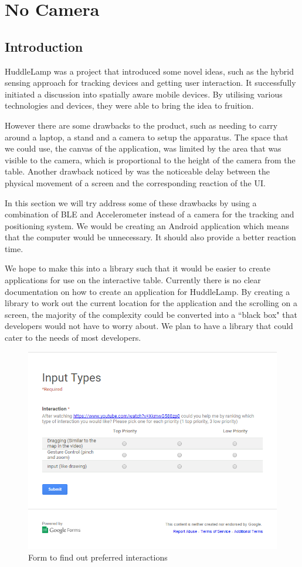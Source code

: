 \chapter{No Camera}

\label{ch:no_camera}

\section{Introduction}
HuddleLamp was a project that introduced some novel ideas, such as the hybrid sensing approach for tracking devices and getting user interaction. It successfully initiated a discussion into spatially aware mobile devices. By utilising various technologies and devices, they were able to bring the idea to fruition. 

However there are some drawbacks to the product, such as needing to carry around a laptop, a stand and a camera to setup the apparatus. The space that we could use, the canvas of the application, was limited by the area that was visible to the camera, which is proportional to the height of the camera from the table. Another drawback noticed by \citeauthor{huddlelamp-paper} was the noticeable delay between the physical movement of a screen and the corresponding reaction of the UI\cite{huddlelamp-paper}. 

In this section we will try address some of these drawbacks by using a combination of BLE and Accelerometer instead of a camera for the tracking and positioning system. We would be creating an Android application which means that the computer would be unnecessary. It should also provide a better reaction time. 

We hope to make this into a library such that it would be easier to create applications for use on the interactive table. Currently there is no clear documentation on how to create an application for HuddleLamp. By creating a library to work out the current location for the application and the scrolling on a screen, the majority of the complexity could be converted into a ``black box" that developers would not have to worry about. We plan to have a library that could cater to the needs of most developers. 

\begin{figure}[h]
  \includegraphics[scale=0.7]{images/googleform}
  \protect\caption{Form to find out preferred interactions} 
  \label{googleform}
\end{figure}